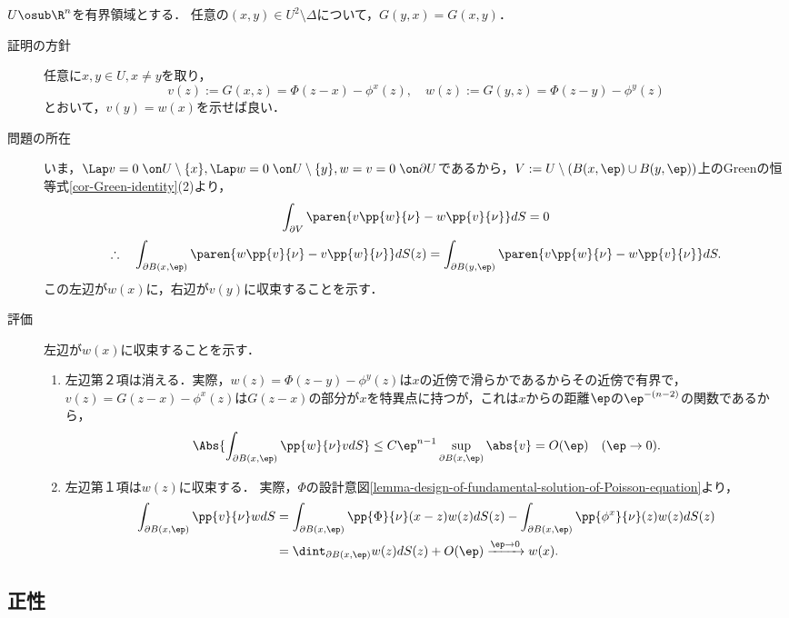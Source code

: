 \documentclass[uplatex,dvipdfmx]{jsreport}
\begin{document}
\begin{theorem}[Green関数は対称である]
    $U\osub\R^n$を有界領域とする．
    任意の$(x,y)\in U^2\setminus\Delta$について，$G(y,x)=G(x,y)$．
\end{theorem}
\begin{Proof}\mbox{}
    \begin{description}
        \item[証明の方針] 任意に$x,y\in U,x\ne y$を取り，
        \[v(z):=G(x,z)=\Phi(z-x)-\phi^x(z),\quad w(z):=G(y,z)=\Phi(z-y)-\phi^y(z)\]
        とおいて，$v(y)=w(x)$を示せば良い．
        \item[問題の所在] いま，$\Lap v=0\;\on U\setminus\{x\},\Lap w=0\;\on U\setminus\{y\},w=v=0\;\on\partial U$であるから，$V:=U\setminus(B(x,\ep)\cup B(y,\ep))$上のGreenの恒等式\ref{cor-Green-identity}(2)より，
        \[\int_{\partial V}\paren{v\pp{w}{\nu}-w\pp{v}{\nu}}dS=0\]
        \[\therefore\quad\int_{\partial B(x,\ep)}\paren{w\pp{v}{\nu}-v\pp{w}{\nu}}dS(z)=\int_{\partial B(y,\ep)}\paren{v\pp{w}{\nu}-w\pp{v}{\nu}}dS.\]
        この左辺が$w(x)$に，右辺が$v(y)$に収束することを示す．
        \item[評価] 左辺が$w(x)$に収束することを示す．
        \begin{enumerate}
            \item 左辺第２項は消える．実際，$w(z)=\Phi(z-y)-\phi^y(z)$は$x$の近傍で滑らかであるからその近傍で有界で，$v(z)=G(z-x)-\phi^x(z)$は$G(z-x)$の部分が$x$を特異点に持つが，これは$x$からの距離$\ep$の$\ep^{-(n-2)}$の関数であるから，
            \[\Abs{\int_{\partial B(x,\ep)}\pp{w}{\nu}vdS}\le C\ep^{n-1}\sup_{\partial B(x,\ep)}\abs{v}=O(\ep)\quad(\ep\to0).\]
            \item 左辺第１項は$w(z)$に収束する．
            実際，$\Phi$の設計意図\ref{lemma-design-of-fundamental-solution-of-Poisson-equation}より，
            \begin{align*}
                \int_{\partial B(x,\ep)}\pp{v}{\nu}wdS&=\int_{\partial B(x,\ep)}\pp{\Phi}{\nu}(x-z)w(z)dS(z)-\int_{\partial B(x,\ep)}\pp{\phi^x}{\nu}(z)w(z)dS(z)\\
                &=\dint_{\partial B(x,\ep)}w(z)dS(z)+O(\ep)\xrightarrow{\ep\to0}w(x).
            \end{align*}
        \end{enumerate}
    \end{description}
\end{Proof}

\subsection{正性}
\end{document}
